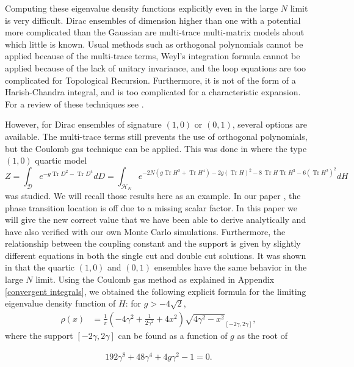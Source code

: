 \documentclass[10pt]{article}
\DeclareMathOperator{\tr}{Tr}
\begin{document}
Computing these eigenvalue density functions explicitly even in the large $N$ limit is very difficult. Dirac ensembles of dimension higher than one with a potential more complicated than the Gaussian are multi-trace multi-matrix models about which little is known. Usual methods such as orthogonal polynomials cannot be applied because of the multi-trace terms, Weyl's integration formula cannot be applied because of the lack of unitary invariance, and the loop equations are  too complicated for Topological Recursion. Furthermore, it is not of the form of a Harish-Chandra integral, and is too complicated for a characteristic expansion. For a review of these techniques see \cite{Random Matrices}. 

However, for Dirac ensembles of signature $(1,0)$ or $(0,1)$, several options are available. The multi-trace terms still prevents the use of orthogonal polynomials, but the Coulomb gas technique can be applied. This was done in \cite{First paper} where the type $(1,0)$ quartic model  
\begin{equation*}
	Z = \int_{\mathcal{D}}e^{-g \tr D^2 - \tr D^4 }dD = \int_{\mathcal{H}_{N}}e^{-2N(g \tr H^2 +   \tr H^4) -2g (\tr H)^2 - 8 \,\tr H \tr H^3 - 6(\tr H^2)^2 }dH
\end{equation*}
was studied. We will recall those results here as an example. In our paper \cite{First paper}, the phase transition location is off due to a missing scalar factor. In this paper we will give the new correct value that we have been able to derive analytically and have also verified with our own Monte Carlo simulations. Furthermore, the relationship between the coupling constant and the support is given by slightly different equations in both the single cut and double cut solutions.  It was shown in \cite{First paper} that the quartic $(1,0)$ and $(0,1)$ ensembles have the same behavior in the large $N$ limit. Using the Coulomb gas method as explained in Appendix \ref{convergent integrals}, we obtained the following explicit formula for the limiting eigenvalue density function of $H$: for $g > -4\sqrt{2}$,
\begin{align*}
\rho(x)&=  \frac{1}{\pi}(-4\gamma^{2} +\frac{1}{2\gamma^{2}} + 4x^{2})\sqrt{4\gamma^{2}-x^{2}}_{[-2\gamma,2\gamma]},
\end{align*}
where  the support $[-2\gamma,2\gamma]$ can be found as a function of $g$ as the root of

\begin{align*} 
192 \gamma^8 + 48 \gamma^4 + 4 g \gamma^2 -1 = 0.
\end{align*}
 
\end{document}
